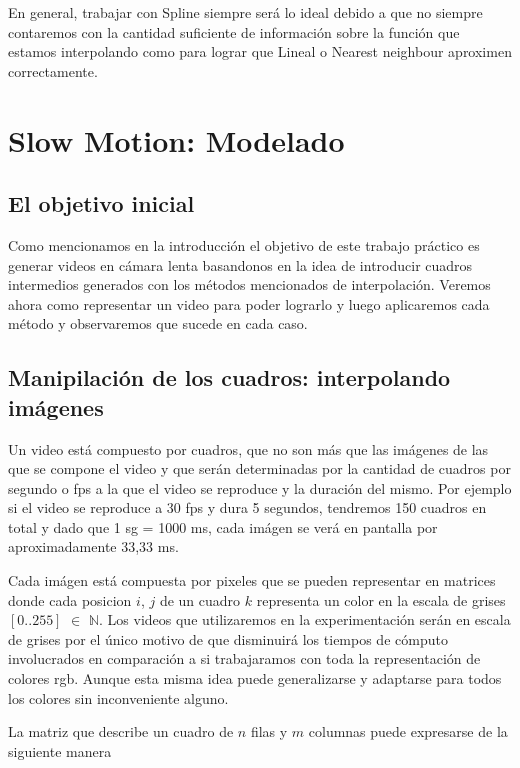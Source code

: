 En general, trabajar con Spline siempre será lo ideal debido a que no siempre contaremos con la cantidad suficiente de información sobre la función que estamos interpolando como para lograr que Lineal o Nearest neighbour aproximen correctamente. 

\section{Slow Motion: Modelado}

\subsection{El objetivo inicial}

Como mencionamos en la introducción el objetivo de este trabajo práctico es generar videos en cámara lenta basandonos en la idea de introducir cuadros intermedios generados con los métodos mencionados de interpolación. Veremos ahora como representar un video para poder lograrlo y luego aplicaremos cada método y observaremos que sucede en cada caso.

\subsection{Manipilación de los cuadros: interpolando imágenes}

Un video está compuesto por cuadros, que no son más que las imágenes de las que se compone el video   y que serán determinadas por la cantidad de cuadros por segundo o fps a la que el video se reproduce y la duración del mismo.
Por ejemplo si el video se reproduce a 30 fps y dura 5 segundos, tendremos 150 cuadros en total y dado que 1 sg = 1000 ms, cada imágen se verá en pantalla por aproximadamente 33,33 ms.

Cada imágen está compuesta por pixeles que se pueden representar en matrices donde cada posicion $i$, $j$ de un cuadro $k$ representa un color en la escala de grises $[0..255]$ $\in$ $\mathbb{N}$. Los videos que utilizaremos en la experimentación serán en escala de grises por el único motivo de que disminuirá los tiempos de cómputo involucrados en comparación a si trabajaramos con toda la representación de colores rgb. Aunque esta misma idea puede generalizarse y adaptarse para todos los colores sin inconveniente alguno.

La matriz que describe un cuadro de $n$ filas y $m$ columnas puede expresarse de la siguiente manera

\vspace{4mm}

